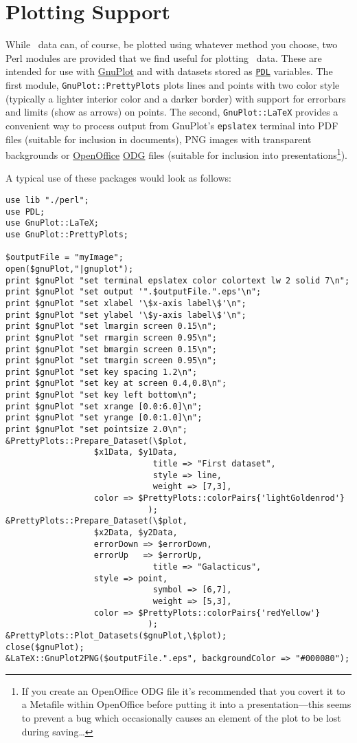 \chapter{Plotting Support}

While \glc\ data can, of course, be plotted using whatever method you choose, two Perl modules are provided that we find useful for plotting \glc\ data. These are intended for use with \href{http://www.gnuplot.info/}{\sc GnuPlot} and with datasets stored as \href{http://pdl.perl.org/}{\tt PDL} variables. The first module, {\tt GnuPlot::PrettyPlots} plots lines and points with two color style (typically a lighter interior color and a darker border) with support for errorbars and limits (show as arrows) on points. The second, {\tt GnuPlot::LaTeX} provides a convenient way to process output from {\sc GnuPlot}'s {\tt epslatex} terminal into PDF files (suitable for inclusion in documents), PNG images with transparent backgrounds or \href{http://www.openoffice.org/}{OpenOffice} \href{http://www.wikimedia.org/wikipedia/en/wiki/OpenDocument}{ODG} files (suitable for inclusion into presentations\footnote{If you create an OpenOffice ODG file it's recommended that you covert it to a Metafile within OpenOffice before putting it into a presentation---this seems to prevent a bug which occasionally causes an element of the plot to be lost during saving\ldots}).

A typical use of these packages would look as follows:
\begin{verbatim}
use lib "./perl";
use PDL;
use GnuPlot::LaTeX;
use GnuPlot::PrettyPlots;

$outputFile = "myImage";
open($gnuPlot,"|gnuplot");
print $gnuPlot "set terminal epslatex color colortext lw 2 solid 7\n";
print $gnuPlot "set output '".$outputFile.".eps'\n";
print $gnuPlot "set xlabel '\$x-axis label\$'\n";
print $gnuPlot "set ylabel '\$y-axis label\$'\n";
print $gnuPlot "set lmargin screen 0.15\n";
print $gnuPlot "set rmargin screen 0.95\n";
print $gnuPlot "set bmargin screen 0.15\n";
print $gnuPlot "set tmargin screen 0.95\n";
print $gnuPlot "set key spacing 1.2\n";
print $gnuPlot "set key at screen 0.4,0.8\n";
print $gnuPlot "set key left bottom\n";
print $gnuPlot "set xrange [0.0:6.0]\n";
print $gnuPlot "set yrange [0.0:1.0]\n";
print $gnuPlot "set pointsize 2.0\n";
&PrettyPlots::Prepare_Dataset(\$plot,
			      $x1Data, $y1Data,
                              title => "First dataset",
                              style => line,
                              weight => [7,3],
			      color => $PrettyPlots::colorPairs{'lightGoldenrod'}
                             );
&PrettyPlots::Prepare_Dataset(\$plot,
			      $x2Data, $y2Data,
			      errorDown => $errorDown,
			      errorUp   => $errorUp,
                              title => "Galacticus",
			      style => point,
                              symbol => [6,7],
                              weight => [5,3],
			      color => $PrettyPlots::colorPairs{'redYellow'}
                             );
&PrettyPlots::Plot_Datasets($gnuPlot,\$plot);
close($gnuPlot);
&LaTeX::GnuPlot2PNG($outputFile.".eps", backgroundColor => "#000080");
\end{verbatim}

